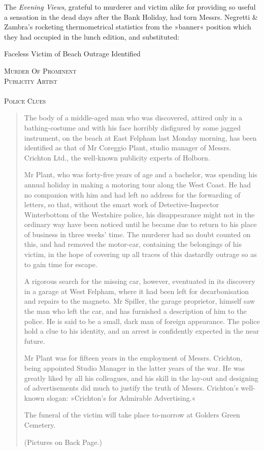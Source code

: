 The \textit{Evening Views}, grateful to murderer and victim alike for providing so useful a sensation in the dead days after the Bank Holiday, had torn Messrs. Negretti \& Zambra's rocketing thermometrical statistics from the »banner« position which they had occupied in the lunch edition, and substituted:
\begin{center}
Faceless Victim of Beach Outrage Identified

\textsc{Murder Of Prominent\\
Publicity Artist\\
~\\
Police Clues}
\end{center}

\begin{quotation}
The body of a middle-aged man who was discovered, attired only in a bathing-costume and with his face horribly disfigured by some jagged instrument, on the beach at East Felpham last Monday morning, has been identified as that of Mr Coreggio Plant, studio manager of Messrs. Crichton Ltd., the well-known publicity experts of Holborn.

Mr Plant, who was forty-five years of age and a bachelor, was spending his annual holiday in making a motoring tour along the West Coast. He had no companion with him and had left no address for the forwarding of letters, so that, without the smart work of Detective-Inspector Winterbottom of the Westshire police, his disappearance might not in the ordinary way have been noticed until he became due to return to his place of business in three weeks' time. The murderer had no doubt counted on this, and had removed the motor-car, containing the belongings of his victim, in the hope of covering up all traces of this dastardly outrage so as to gain time for escape.

A rigorous search for the missing car, however, eventuated in its discovery in a garage at West Felpham, where it had been left for decarbonisation and repairs to the magneto. Mr Spiller, the garage proprietor, himself saw the man who left the car, and has furnished a description of him to the police. He is said to be a small, dark man of foreign appearance. The police hold a clue to his identity, and an arrest is confidently expected in the near future.

Mr Plant was for fifteen years in the employment of Messrs. Crichton, being appointed Studio Manager in the latter years of the war. He was greatly liked by all his colleagues, and his skill in the lay-out and designing of advertisements did much to justify the truth of Messrs. Crichton's well-known slogan: »Crichton's for Admirable Advertising.«

The funeral of the victim will take place to-morrow at Golders Green Cemetery.

(Pictures on Back Page.)
\end{quotation}

